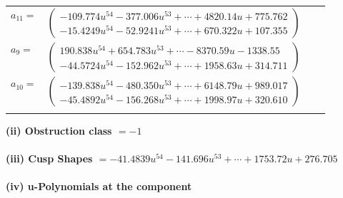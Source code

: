 \documentclass[1p]{elsarticle_modified}
\theoremstyle{definition}
\begin{document}
\begin{tabular}{m{7pt} m{180pt} m{7pt} m{180pt} }
\flushright $a_{11}=$&$\begin{pmatrix}-109.774 u^{54}-377.006 u^{53}+\cdots+4820.14 u+775.762\\-15.4249 u^{54}-52.9241 u^{53}+\cdots+670.322 u+107.355\end{pmatrix}$ \\
\flushright $a_{9}=$&$\begin{pmatrix}190.838 u^{54}+654.783 u^{53}+\cdots-8370.59 u-1338.55\\-44.5724 u^{54}-152.962 u^{53}+\cdots+1958.63 u+314.711\end{pmatrix}$ \\
\flushright $a_{10}=$&$\begin{pmatrix}-139.838 u^{54}-480.350 u^{53}+\cdots+6148.79 u+989.017\\-45.4892 u^{54}-156.268 u^{53}+\cdots+1998.97 u+320.610\end{pmatrix}$\\&\end{tabular}
\flushleft \textbf{(ii) Obstruction class $= -1$}\\~\\
\flushleft \textbf{(iii) Cusp Shapes $= -41.4839 u^{54}-141.696 u^{53}+\cdots+1753.72 u+276.705$}\\~\\
\newpage\renewcommand{\arraystretch}{1}
\flushleft \textbf{(iv) u-Polynomials at the component}\newline \\
\end{document}
